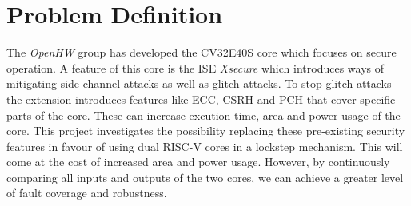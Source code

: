 



\section{Problem Definition}
\label{sec:problem_definition}

The \textit{OpenHW} group has developed the CV32E40S core which focuses on secure operation. A feature of this core is the ISE \textit{Xsecure} which introduces ways of mitigating side-channel attacks as well as glitch attacks. To stop glitch attacks the extension introduces features like ECC, CSRH and PCH that cover specific parts of the core. These can increase excution time, area and power usage of the core. This project investigates the possibility replacing these pre-existing security features in favour of using dual RISC-V cores in a lockstep mechanism. This will come at the cost of increased area and power usage. However, by continuously comparing all inputs and outputs of the two cores, we can achieve a greater level of fault coverage and robustness. 


